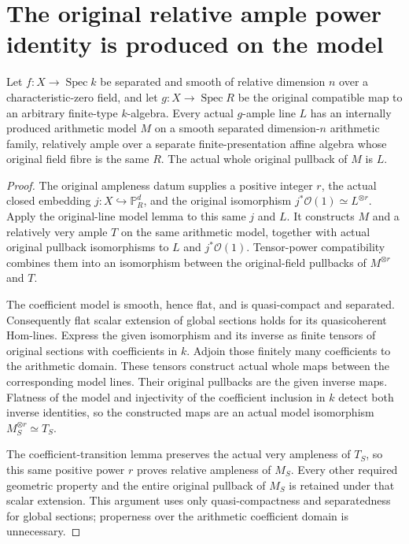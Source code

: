 \section{The original relative ample power identity is produced on the model}

\begin{lemma}
\label{lem:kn-relative-arithmetic-original-ample-model}
\leanok
Let $f:X\to\operatorname{Spec}k$ be separated and smooth of
relative dimension $n$ over a characteristic-zero field, and let
$g:X\to\operatorname{Spec}R$ be the original compatible map to
an arbitrary finite-type $k$-algebra.  Every actual $g$-ample
line $L$ has an internally produced arithmetic model $M$ on a
smooth separated dimension-$n$ arithmetic family, relatively
ample over a separate finite-presentation affine algebra whose
original field fibre is the same $R$.  The actual whole original
pullback of $M$ is $L$.
\end{lemma}
\begin{proof}
The original ampleness datum supplies a positive integer $r$,
the actual closed embedding $j:X\hookrightarrow\mathbb P_R^d$,
and the original isomorphism $j^*\mathcal O(1)\simeq L^{\otimes r}$.
Apply the original-line model lemma to this same $j$ and $L$.
It constructs $M$ and a relatively very ample $T$ on the same
arithmetic model, together with actual original pullback
isomorphisms to $L$ and $j^*\mathcal O(1)$.  Tensor-power
compatibility combines them into an isomorphism between the
original-field pullbacks of $M^{\otimes r}$ and $T$.

The coefficient model is smooth, hence flat, and is
quasi-compact and separated.  Consequently flat scalar
extension of global sections holds for its quasicoherent
Hom-lines.  Express the given isomorphism and its inverse as
finite tensors of original sections with coefficients in $k$.
Adjoin those finitely many coefficients to the arithmetic
domain.  These tensors construct actual whole maps between
the corresponding model lines.  Their original pullbacks are
the given inverse maps.  Flatness of the model and injectivity
of the coefficient inclusion in $k$ detect both inverse
identities, so the constructed maps are an actual model
isomorphism $M_S^{\otimes r}\simeq T_S$.

The coefficient-transition lemma preserves the actual very
ampleness of $T_S$, so this same positive power $r$ proves
relative ampleness of $M_S$.  Every other required geometric
property and the entire original pullback of $M_S$ is retained
under that scalar extension.  This argument uses only
quasi-compactness and separatedness for global sections;
properness over the arithmetic coefficient domain is unnecessary.
\end{proof}
